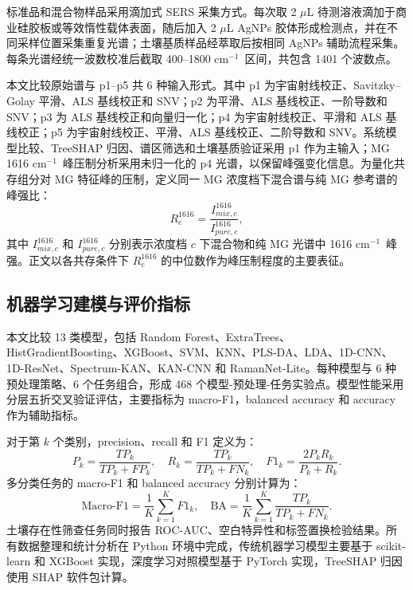 \documentclass[preprint,12pt]{elsarticle}
\newcommand{\cmone}{cm$^{-1}$}
\begin{document}
标准品和混合物样品采用滴加式 SERS 采集方式。每次取 2 $\mu$L 待测溶液滴加于商业硅胶板或等效惰性载体表面，随后加入 2 $\mu$L AgNPs 胶体形成检测点，并在不同采样位置采集重复光谱；土壤基质样品经萃取后按相同 AgNPs 辅助流程采集。每条光谱经统一波数校准后截取 400--1800 \cmone\ 区间，共包含 1401 个波数点。

本文比较原始谱与 p1--p5 共 6 种输入形式。其中 p1 为宇宙射线校正、Savitzky--Golay 平滑、ALS 基线校正和 SNV；p2 为平滑、ALS 基线校正、一阶导数和 SNV；p3 为 ALS 基线校正和向量归一化；p4 为宇宙射线校正、平滑和 ALS 基线校正；p5 为宇宙射线校正、平滑、ALS 基线校正、二阶导数和 SNV。系统模型比较、TreeSHAP 归因、谱区筛选和土壤基质验证采用 p1 作为主输入；MG 1616 \cmone\ 峰压制分析采用未归一化的 p4 光谱，以保留峰强变化信息。为量化共存组分对 MG 特征峰的压制，定义同一 MG 浓度档下混合谱与纯 MG 参考谱的峰强比：
\begin{equation}
R_{c}^{1616}=\frac{I_{mix,c}^{1616}}{I_{pure,c}^{1616}},
\end{equation}
其中 $I_{mix,c}^{1616}$ 和 $I_{pure,c}^{1616}$ 分别表示浓度档 $c$ 下混合物和纯 MG 光谱中 1616 \cmone\ 峰强。正文以各共存条件下 $R_{c}^{1616}$ 的中位数作为峰压制程度的主要表征。

\subsection{机器学习建模与评价指标}

本文比较 13 类模型，包括 Random Forest、ExtraTrees、HistGradientBoosting、XGBoost、SVM、KNN、PLS-DA、LDA、1D-CNN、1D-ResNet、Spectrum-KAN、KAN-CNN 和 RamanNet-Lite。每种模型与 6 种预处理策略、6 个任务组合，形成 468 个模型-预处理-任务实验点。模型性能采用分层五折交叉验证评估，主要指标为 macro-F1，balanced accuracy 和 accuracy 作为辅助指标。

对于第 $k$ 个类别，precision、recall 和 F1 定义为：
\begin{equation}
P_k=\frac{TP_k}{TP_k+FP_k}, \quad
R_k=\frac{TP_k}{TP_k+FN_k}, \quad
F1_k=\frac{2P_kR_k}{P_k+R_k}.
\end{equation}
多分类任务的 macro-F1 和 balanced accuracy 分别计算为：
\begin{equation}
\mathrm{Macro\text{-}F1}=\frac{1}{K}\sum_{k=1}^{K}F1_k, \quad
\mathrm{BA}=\frac{1}{K}\sum_{k=1}^{K}\frac{TP_k}{TP_k+FN_k}.
\end{equation}
土壤存在性筛查任务同时报告 ROC-AUC、空白特异性和标签置换检验结果。所有数据整理和统计分析在 Python 环境中完成，传统机器学习模型主要基于 scikit-learn 和 XGBoost 实现，深度学习对照模型基于 PyTorch 实现，TreeSHAP 归因使用 SHAP 软件包计算。
\end{document}
